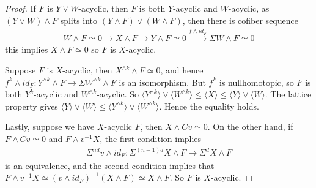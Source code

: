 \begin{proof}
    If $F$ is $Y\vee W$-acyclic, then $F$ is both $Y$-acyclic and $W$-acyclic, as $(Y\vee W)\wedge F$ splits into $(Y\wedge F)\vee (W\wedge F)$, then there is cofiber sequence
    \begin{align*}
        W\wedge F\simeq 0\to X\wedge F\to  Y\wedge F\simeq 0\xrightarrow{f\wedge id_F}\Sigma W\wedge F \simeq 0
    \end{align*} this implies $X\wedge F\simeq 0$ so $F$ is $X$-acyclic.

    Suppose $F$ is $X$-acyclic, then $X^{\wedge k}\wedge F\simeq 0$, and hence $f^k\wedge id_F: Y^{\wedge k}\wedge F\to \Sigma W^{\wedge k}\wedge F$ is an isomorphism. But $f^k$ is nullhomotopic, so $F$ is both $Y^k$-acyclic and $W^{\wedge k}$-acyclic. So $\langle Y^{\wedge k}\rangle\vee \langle W^{\wedge k}\rangle\leq \langle X\rangle\leq \langle Y\rangle\vee\langle W\rangle$. The lattice property gives $ \langle Y\rangle\vee\langle W\rangle\leq \langle Y^{\wedge k}\rangle\vee \langle W^{\wedge k}\rangle$. Hence the equality holds.

Lastly, suppose we have $X$-acyclic $F$, then $X\wedge Cv\simeq 0$. On the other hand, if $F\wedge Cv\simeq 0$ and $F\wedge v^{-1}X$, the first condition implies
\begin{align*}
    \Sigma^{nd}v\wedge id_F: \Sigma^{(n-1)d}X\wedge F\to \Sigma^{d}X\wedge F
\end{align*}is an equivalence, and the second condition implies that $F\wedge v^{-1}X\simeq ( v\wedge id_F)^{-1}(X\wedge F)\simeq X\wedge F$. So $F$ is $X$-acyclic.
\end{proof}
